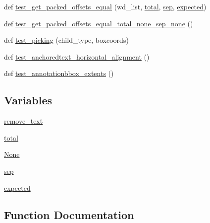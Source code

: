 \begin{DoxyCompactItemize}
\item 
def \hyperlink{namespacematplotlib_1_1tests_1_1test__offsetbox_a63177ed902dddad7d8dce3f0e3282188}{test\+\_\+get\+\_\+packed\+\_\+offsets\+\_\+equal} (wd\+\_\+list, \hyperlink{namespacematplotlib_1_1tests_1_1test__offsetbox_a0a4b466093ae57e6600683cc22629c86}{total}, \hyperlink{namespacematplotlib_1_1tests_1_1test__offsetbox_afd15cd9b9929a629b0337df5a5b03397}{sep}, \hyperlink{namespacematplotlib_1_1tests_1_1test__offsetbox_a5927cc5d31f916316136b0fe08599715}{expected})
\item 
def \hyperlink{namespacematplotlib_1_1tests_1_1test__offsetbox_ae5679fbd76ba28c99991c2e97a5630e2}{test\+\_\+get\+\_\+packed\+\_\+offsets\+\_\+equal\+\_\+total\+\_\+none\+\_\+sep\+\_\+none} ()
\item 
def \hyperlink{namespacematplotlib_1_1tests_1_1test__offsetbox_ae9f1e5d7ab94c25d040b8d7da94a730e}{test\+\_\+picking} (child\+\_\+type, boxcoords)
\item 
def \hyperlink{namespacematplotlib_1_1tests_1_1test__offsetbox_a724271c15ac55a4dbb5810e1558d9460}{test\+\_\+anchoredtext\+\_\+horizontal\+\_\+alignment} ()
\item 
def \hyperlink{namespacematplotlib_1_1tests_1_1test__offsetbox_a6253d5841f0469d47ed89e83e4120d3f}{test\+\_\+annotationbbox\+\_\+extents} ()
\end{DoxyCompactItemize}
\subsection*{Variables}
\begin{DoxyCompactItemize}
\item 
\hyperlink{namespacematplotlib_1_1tests_1_1test__offsetbox_a6f3e0c9bb11508f725827911dd5a04ce}{remove\+\_\+text}
\item 
\hyperlink{namespacematplotlib_1_1tests_1_1test__offsetbox_a0a4b466093ae57e6600683cc22629c86}{total}
\item 
\hyperlink{namespacematplotlib_1_1tests_1_1test__offsetbox_a82e9eb2aded634788892dd76666c03eb}{None}
\item 
\hyperlink{namespacematplotlib_1_1tests_1_1test__offsetbox_afd15cd9b9929a629b0337df5a5b03397}{sep}
\item 
\hyperlink{namespacematplotlib_1_1tests_1_1test__offsetbox_a5927cc5d31f916316136b0fe08599715}{expected}
\end{DoxyCompactItemize}


\subsection{Function Documentation}
\mbox{\label{namespacematplotlib_1_1tests_1_1test__offsetbox_a724271c15ac55a4dbb5810e1558d9460}} 
